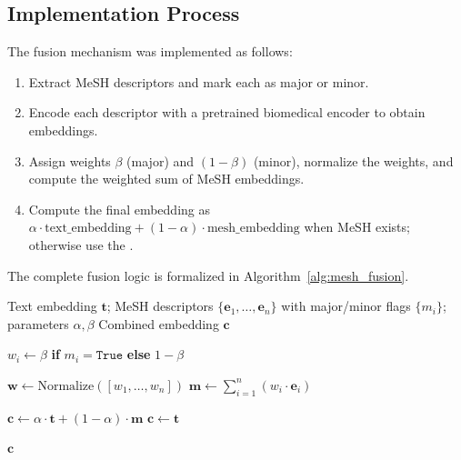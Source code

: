 \documentclass[utf8]{FrontiersinHarvard}
\begin{document}
\subsection{Implementation Process}

The fusion mechanism was implemented as follows:
\begin{enumerate}[leftmargin=*,label=\arabic*.]
    \item Extract MeSH descriptors and mark each as major or minor.
    \item Encode each descriptor with a pretrained biomedical encoder to obtain embeddings.
    \item Assign weights $\beta$ (major) and $(1-\beta)$ (minor), normalize the weights, and compute the weighted sum of MeSH embeddings.
    \item Compute the final embedding as $\alpha\cdot\text{text\_embedding} + (1-\alpha)\cdot\text{mesh\_embedding}$ when MeSH exists; otherwise use the .
\end{enumerate}

The complete fusion logic is formalized in Algorithm~\ref{alg:mesh_fusion}.

\begin{algorithm}[H]
\caption{Text--MeSH Fusion with Major/Minor Weights}
\label{alg:mesh_fusion}
\begin{algorithmic}[1]
\Require Text embedding $\bm{t}$; MeSH descriptors $\{\bm{e}_1,\ldots,\bm{e}_n\}$ with major/minor flags $\{m_i\}$; parameters $\alpha,\beta$
\Ensure Combined embedding $\bm{c}$

    \State $w_i \gets \beta$ \textbf{if} $m_i = \texttt{True}$ \textbf{else} $1-\beta$
\EndFor

\State $\bm{w} \gets \mathrm{Normalize}([w_1,\ldots,w_n])$
\State $\bm{m} \gets \sum_{i=1}^{n} (w_i \cdot \bm{e}_i)$

    \State $\bm{c} \gets \alpha \cdot \bm{t} + (1-\alpha) \cdot \bm{m}$
\Else
    \State $\bm{c} \gets \bm{t}$
\EndIf

\State \Return $\bm{c}$
\end{algorithmic}
\end{algorithm}
\end{document}
